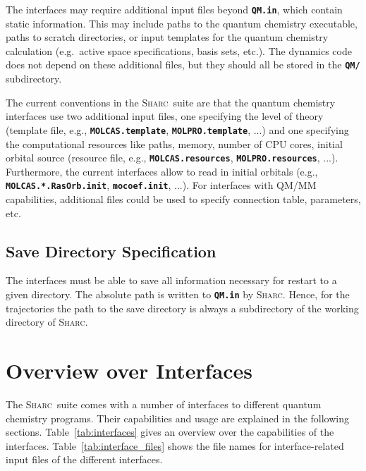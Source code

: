 \documentclass[a4paper,10pt,DIV=15,openany,twoside=false]{scrbook}
\newcommand{\sharc}{\textsc{Sharc}}
\newcommand{\ttt}[1]{\textbf{\texttt{#1}}}
\begin{document}
The interfaces may require additional input files beyond \ttt{QM.in}, which contain static information. This may include paths to the quantum chemistry executable, paths to scratch directories, or input templates for the quantum chemistry calculation (e.g.\ active space specifications, basis sets, etc.).
The dynamics code does not depend on these additional files, but they should all be stored in the \ttt{QM/} subdirectory.

The current conventions in the \sharc\ suite are that the quantum chemistry interfaces use two additional input files, one specifying the level of theory (template file, e.g., \ttt{MOLCAS.template}, \ttt{MOLPRO.template}, ...) and one specifying the computational resources like paths, memory, number of CPU cores, initial orbital source (resource file, e.g., \ttt{MOLCAS.resources}, \ttt{MOLPRO.resources}, ...).
Furthermore, the current interfaces allow to read in initial orbitals (e.g., \ttt{MOLCAS.*.RasOrb.init}, \ttt{mocoef.init}, ...).
For interfaces with QM/MM capabilities, additional files could be used to specify connection table, parameters, etc.



\subsection{Save Directory Specification}

The interfaces must be able to save all information necessary for restart to a given directory. The absolute path is written to \ttt{QM.in} by \sharc. Hence, for the trajectories the path to the save directory is always a subdirectory of the working directory of \sharc.



\clearpage
\section{Overview over Interfaces}\label{sec:int:overview}

The \sharc\ suite comes with a number of interfaces to different quantum chemistry programs.
Their capabilities and usage are explained in the following sections.
Table~\ref{tab:interfaces} gives an overview over the capabilities of the interfaces.
Table~\ref{tab:interface_files} shows the file names for interface-related input files of the different interfaces.
\end{document}
